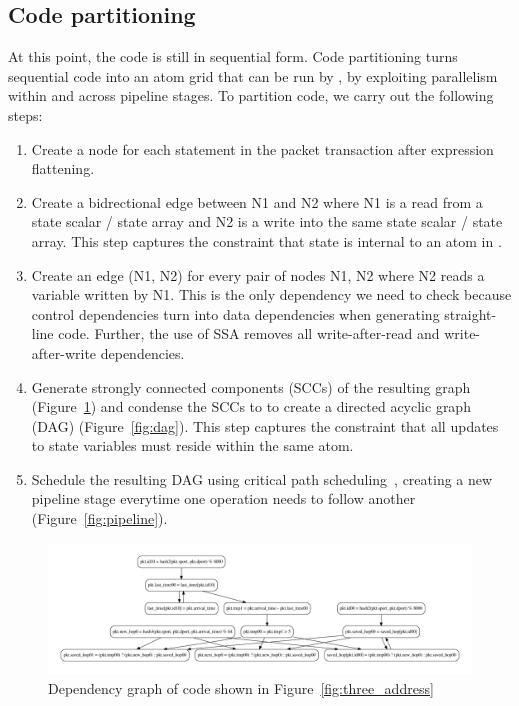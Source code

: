 \subsection{Code partitioning}
At this point, the code is still in sequential form. Code partitioning
turns sequential code into an atom grid that can be run by \absmachine , by
exploiting parallelism within and across pipeline stages.
To partition code, we carry out the following steps:
\begin{enumerate}
  \item Create a node for each statement in the packet transaction after
    expression flattening.
  \item Create a bidrectional edge between N1 and N2 where N1 is a read from a
    state scalar / state array and N2 is a write into the same state scalar /
    state array. This step captures the constraint that state is internal to an
    atom in \absmachine.
  \item Create an edge (N1, N2) for every pair of nodes N1, N2 where N2 reads
    a variable written by N1. This is the only dependency we need to check because
    control dependencies turn into data dependencies when generating straight-line
    code. Further, the use of SSA removes all write-after-read and write-after-write
    dependencies.
  \item Generate strongly connected components (SCCs) of the resulting graph
    (Figure~\ref{fig:deps}) and condense the SCCs to to create a directed
    acyclic graph (DAG) (Figure~\ref{fig:dag}). This step captures the
    constraint that all updates to state variables must reside within the same
    atom.
  \item Schedule the resulting DAG using critical path
    scheduling~\cite{crit_path_sched}, creating a new pipeline stage everytime
    one operation needs to follow another (Figure~\ref{fig:pipeline}).
\end{enumerate}

\begin{figure}
  \includegraphics[width=\textwidth]{deps.pdf}
  \caption{Dependency graph of code shown in Figure~\ref{fig:three_address}}
  \label{fig:deps}
\end{figure}

